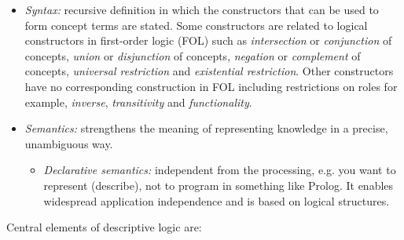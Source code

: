 \begin{itemize}
    \item \textit{Syntax:}  recursive definition in which the constructors that can be used to form concept terms are stated. Some constructors are related to logical constructors in first-order logic (FOL) such as \textit{intersection} or \textit{conjunction} of concepts, \textit{union} or \textit{disjunction} of concepts, \textit{negation} or \textit{complement} of concepts, \textit{universal restriction} and \textit{existential restriction}. Other constructors have no corresponding construction in FOL including restrictions on roles for example, \textit{inverse}, \textit{transitivity} and \textit{functionality}.
    \item \textit{Semantics:} strengthens the meaning of representing knowledge in a precise, unambiguous way.
    \begin{itemize}
        \item \textit{Declarative semantics:} independent from the processing, e.g. you want to represent (describe), not to program in something like Prolog. It enables widespread application independence and is based on logical structures.
    \end{itemize}
\end{itemize}
Central elements of descriptive logic are:
